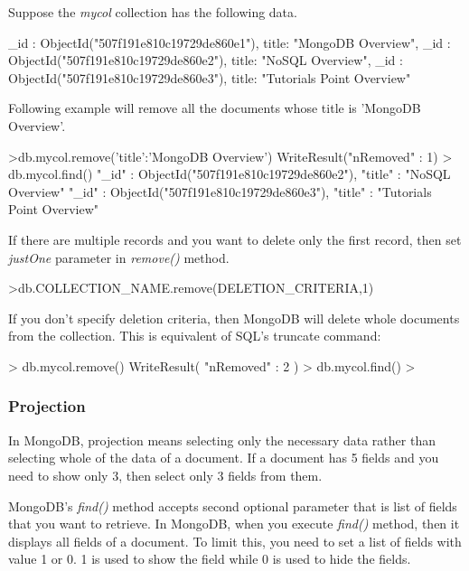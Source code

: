 \documentclass[12pt]{article}
\begin{document}
\begin{bashcode}
\begin{bashcode}
  Suppose the \emph{mycol} collection has the following data.

\begin{javascriptcode}
{_id : ObjectId("507f191e810c19729de860e1"), title: "MongoDB Overview"},
{_id : ObjectId("507f191e810c19729de860e2"), title: "NoSQL Overview"},
{_id : ObjectId("507f191e810c19729de860e3"), title: "Tutorials Point Overview"}
\end{javascriptcode}

Following example will remove all the documents whose title is 'MongoDB Overview'.

  \begin{bashcode}
>db.mycol.remove({'title':'MongoDB Overview'})
WriteResult({"nRemoved" : 1})
> db.mycol.find()
{"_id" : ObjectId("507f191e810c19729de860e2"), "title" : "NoSQL Overview" }
{"_id" : ObjectId("507f191e810c19729de860e3"), "title" : "Tutorials Point Overview" }
  \end{bashcode}

If there are multiple records and you want to delete only the first
  record, then set \emph{justOne} parameter in \emph{remove()} method.

  \begin{bashcode}
>db.COLLECTION_NAME.remove(DELETION_CRITERIA,1)
  \end{bashcode}

If you don't specify deletion criteria, then MongoDB will delete whole
  documents from the collection. This is equivalent of SQL's truncate
  command:
\begin{bashcode}
> db.mycol.remove({})
WriteResult({ "nRemoved" : 2 })
> db.mycol.find()
>
\end{bashcode}

\subsubsection{Projection}
In MongoDB, projection means selecting only the necessary data rather
than selecting whole of the data of a document. If a document has 5
fields and you need to show only 3, then select only 3 fields from them.

MongoDB's \emph{find()} method accepts second optional parameter that is
list of fields that you want to retrieve. In MongoDB, when you execute
\emph{find()} method, then it displays all fields of a document. To
limit this, you need to set a list of fields with value 1 or 0. 1 is
used to show the field while 0 is used to hide the fields.


\end{bashcode}
\end{bashcode}
\end{document}
